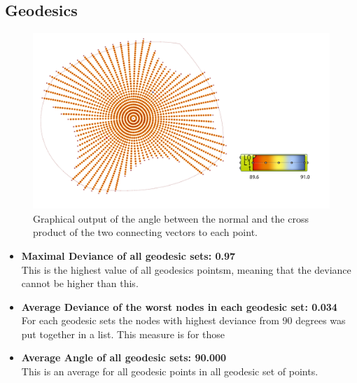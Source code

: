 \subsection{Geodesics}



\begin{figure}[H]
\centering
\includegraphics[width=1.0\linewidth ]{figure/Results/anglesdots2.jpg}
\caption{Graphical output of the angle between the normal and the cross product of the two connecting vectors to each point. }
\end{figure}

\begin{itemize}
    \item \textbf{Maximal Deviance of all geodesic sets: 0.97 \textdegree}\\
    This is the highest value of all geodesics pointsm, meaning that the deviance cannot be higher than this.
    \item \textbf{Average Deviance of the worst nodes in each geodesic set: 0.034 \textdegree}\\
    For each geodesic sets the nodes with highest deviance from 90 degrees was put together in a list. This measure is for those
    \item \textbf{Average Angle of all geodesic sets: 90.000 \textdegree}\\
    This is an average for all geodesic points in all geodesic set of points.
  
\end{itemize}


